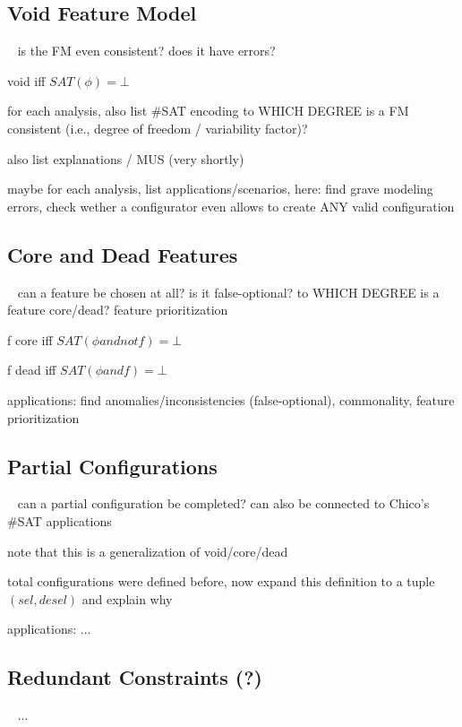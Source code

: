 \subsection{Void Feature Model}
\begin{frame}{~}
	is the FM even consistent? does it have errors? %

	void iff $SAT(\phi) = \bot$

	for each analysis, also list \#SAT encoding
	to WHICH DEGREE is a FM consistent (i.e., degree of freedom / variability factor)?

	also list explanations / MUS (very shortly)

	maybe for each analysis, list applications/scenarios, here: find grave modeling errors, check wether a configurator even allows to create ANY valid configuration
\end{frame}

\subsection{Core and Dead Features} %
\begin{frame}{~}
	can a feature be chosen at all? is it false-optional?
	to WHICH DEGREE is a feature core/dead? feature prioritization
   
	f core iff $SAT(\phi and not f) = \bot$
	
	f dead iff $SAT(\phi and f) = \bot$

	applications: find anomalies/inconsistencies (false-optional), commonality, feature prioritization
\end{frame}

\subsection{Partial Configurations}
\begin{frame}{~}
	can a partial configuration be completed?
	can also be connected to Chico's \#SAT applications

	note that this is a generalization of void/core/dead

	total configurations were defined before, now expand this definition to a tuple $(sel, desel)$ and explain why

	applications: ...
\end{frame}

\subsection{Redundant Constraints (?)}
\begin{frame}{~}
	... %
\end{frame}

